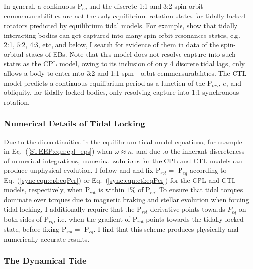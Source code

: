 In general, a continuous P$_{eq}$ and the discrete 1:1 and 3:2 spin-orbit commensurabilities are not the only equilibrium rotation states for tidally locked rotators predicted by equilibrium tidal models. For example, \citet{Rodriguez2012} show that tidally interacting bodies can get captured into many spin-orbit resonances states, e.g. 2:1, 5:2, 4:3, etc, and below, I search for evidence of them in data of the spin-orbital states of \kepler EBs. Note that this model does not resolve capture into such states as the CPL model, owing to its inclusion of only 4 discrete tidal lags, only allows a body to enter into 3:2 and 1:1 spin - orbit commensurabilities. The CTL model predicts a continuous equilibrium period as a function of the P$_{orb}$, $e$, and obliquity, for tidally locked bodies, only resolving capture into 1:1 synchronous rotation.

\subsubsection{Numerical Details of Tidal Locking}

Due to the discontinuities in the equilibrium tidal model equations, for example in Eq.~(\ref{STEEP:eqn:cpl_eps}) when $\omega \approx n$, and due to the inherant discreteness of numerical integrations, numerical solutions for the CPL and CTL models can produce unphysical evolution. I follow \citet{Barnes2013} and \citet{Fleming2018} and fix P$_{rot} = $ P$_{eq}$ according to Eq.~(\ref{sync:eqn:cpl:eqPer}) or Eq.~(\ref{sync:eqn:ctl:eqPer}) for the CPL and CTL models, respectively, when P$_{rot}$ is within $1\%$ of P$_{eq}$.  To ensure that tidal torques dominate over torques due to magnetic braking and stellar evolution when forcing tidal-locking, I additionally require that the P$_{rot}$ derivative points towards $P_{eq}$ on both sides of P$_{eq}$, i.e. when the gradient of P$_{rot}$ points towards the tidally locked state, before fixing P$_{rot} = $ P$_{eq}$. I find that this scheme produces physically and numerically accurate results. 

\subsubsection{The Dynamical Tide} \label{sync:sec:methods:dynamicalTide}

